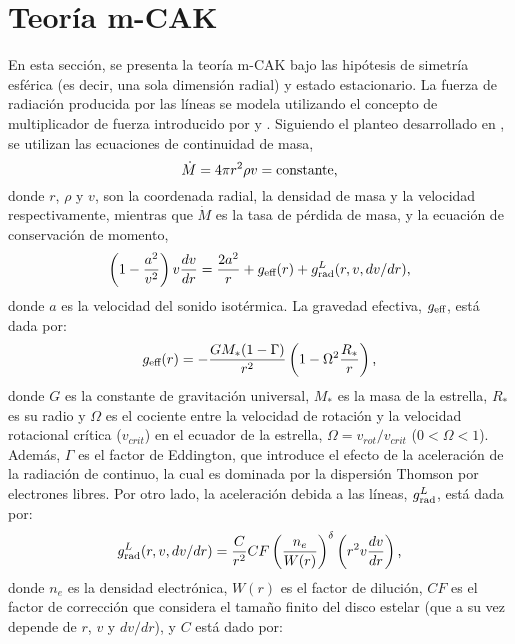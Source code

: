 \documentclass[baaa]{baaa}
\begin{document}
\section{Teor\'ia m-CAK}\label{teoria}
En esta secci\'on, se presenta la teor\'ia m-CAK bajo las hip\'otesis de simetr\'ia esf\'erica (es decir, una sola dimensi\'on radial) y estado estacionario. La fuerza de radiaci\'on producida por las l\'ineas se modela utilizando el concepto de multiplicador de fuerza introducido por \citet*{castorak1975} y \citet{abbott1982}. Siguiendo el planteo desarrollado en \citet{2023curearayareview}, se utilizan las ecuaciones de continuidad de masa,
\begin{equation}\label{1}
  \dot{M} = 4 \pi r^2 \rho v = \textnormal{constante,}
\end{equation}
donde $r$, $\rho$ y $v$, son la coordenada radial, la densidad de masa y la velocidad respectivamente, mientras que $\dot{M}$ es la tasa de p\'erdida de masa, y la ecuaci\'on de conservaci\'on de momento,
\begin{equation}\label{eq-mov}
\left(1- \frac{a^2}{v^2} \right) v \frac{dv}{dr} = \frac{2a^2}{r} + g_{\textnormal{eff}} (r) + g_{\textnormal{rad}}^L (r,v,dv/dr) \textnormal{,}
\end{equation}
donde $a$ es la velocidad del sonido isot\'ermica. La gravedad efectiva, $g_{\textnormal{eff}}$, est\'a dada por:
\begin{equation}
g_{\textnormal{eff}} (r) = - \frac{G M_* (1 - \Gamma)}{r^2} \left(1 - \Omega^2 \frac{R_*}{r} \right) \textnormal{,}
\end{equation}
donde $G$ es la constante de gravitación universal, $M_*$ es la masa de la estrella, $R_*$ es su radio y $\Omega$ es el cociente entre la velocidad de rotaci\'on y la velocidad rotacional cr\'itica ($v_{crit}$) en el ecuador de la estrella, $\Omega = v_{rot} / v_{crit}$ ($0<\Omega<1$). Adem\'as, $\Gamma$ es el factor de Eddington, que introduce el efecto de la aceleraci\'on de la radiaci\'on de continuo, la cual es dominada por la dispersi\'on Thomson por electrones libres. Por otro lado, la aceleraci\'on debida a las l\'ineas, $ g_{\textnormal{rad}}^L$, est\'a dada por:
\begin{equation}\label{4}
 g_{\textnormal{rad}}^L (r,v,dv/dr) = \frac{C}{r^2} CF \left( \frac{n_e}{W(r)} \right)^{\delta} \left(r^2 v \frac{dv}{dr} \right)\textnormal{,}
\end{equation}
donde $n_e$ es la densidad electr\'onica, $W(r)$ es el factor de diluci\'on, $CF$ es el factor de correcci\'on que considera el tamaño finito del disco estelar (que a su vez depende de $r$, $v$ y $dv/dr$), y $C$ est\'a dado por:
\end{document}
